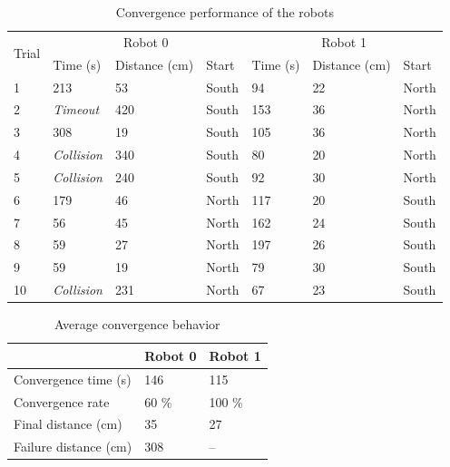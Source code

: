 \documentclass[]{article}
\newcommand{\ra}[1]{\renewcommand{\arraystretch}{#1}}
\begin{document}
\begin{table}[]
\centering
\ra{1.3}
\caption{Convergence performance of the robots}
\label{table:convergence}
\begin{tabular}{@{}lllllll@{}}
\toprule
\multirow{2}{*}{Trial} & \multicolumn{3}{c}{Robot 0}       & \multicolumn{3}{c}{Robot 1}      \\ \cmidrule(l){2-4} \cmidrule(l){5-7}
                       & Time (s)  & Distance (cm) & Start & Time (s) & Distance (cm) & Start \\ \midrule
1                      & 213       & 53            & South & 94       & 22            & North \\
2                      & \emph{Timeout} & 420           & South & 153      & 36            & North \\
3                      & 308       & 19            & South & 105      & 36            & North \\
4                      & \emph{Collision} & 340           & South & 80       & 20            & North \\
5                      & \emph{Collision} & 240           & South & 92       & 30            & North \\
6                      & 179       & 46            & North & 117      & 20            & South \\
7                      & 56        & 45            & North & 162      & 24            & South \\
8                      & 59        & 27            & North & 197      & 26            & South \\
9                      & 59        & 19            & North & 79       & 30            & South \\
10                     & \emph{Collision} & 231           & North & 67       & 23            & South \\ \bottomrule
\end{tabular}
\end{table}

\begin{table}[]
\centering
\ra{1.3}
\caption{Average convergence behavior}
\label{table:averagecon}
\begin{tabular}{@{}lll@{}}
\toprule
                       & Robot 0        & Robot 1     \\ \midrule
Convergence time (s)   & 146            & 115         \\
Convergence rate       & 60 \%          & 100 \%      \\
Final distance (cm)    & 35             & 27          \\
Failure distance (cm)  & 308            & --          \\ \bottomrule
\end{tabular}
\end{table}
\end{document}
